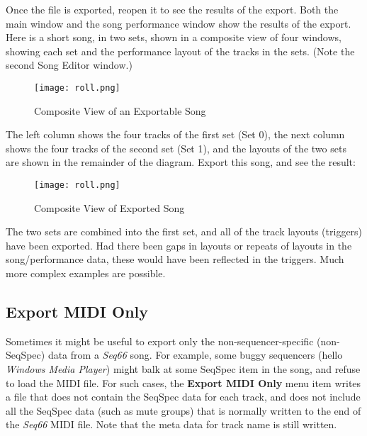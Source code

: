   Once the file is exported, reopen it to see the results of the export.
   Both the main window and the song performance window show the results of the
   export.
   Here is a short song, in two sets, shown in a composite view of
   four windows,
   showing each set and the performance layout of the tracks in the sets.
   (Note the second Song Editor window.)

\begin{figure}[H]
   \centering 
   \texttt{[image: roll.png]}
   \caption{Composite View of an Exportable Song}
   \label{fig:original_song_to_export}
\end{figure}

   The left column shows the four tracks of the first set (Set 0), the next
   column shows the four tracks of the second set (Set 1), and the
   layouts of the two sets are shown in the remainder of the diagram.
   Export this song, and see the result:

\begin{figure}[H]
   \centering 
   \texttt{[image: roll.png]}
   \caption{Composite View of Exported Song}
   \label{fig:song_exported}
\end{figure}

   The two sets are combined into the first set,
   and all of the track layouts (triggers) have been exported.
   Had there been gaps in layouts or repeats of layouts in the song/performance
   data, these would have been reflected in the triggers.
   Much more complex examples are possible.

\subsection{Export MIDI Only}
\label{subsec:midi_export_file_export_midi_only}

   Sometimes it might be useful to export only the non-sequencer-specific
   (non-SeqSpec) data from a \textsl{Seq66} song.
   For example, some buggy sequencers
   (hello \textsl{Windows Media Player})
   might balk at some SeqSpec item in the song, and refuse to load the MIDI
   file.
   For such cases,
   the \textbf{Export MIDI Only} menu item writes a file that does not contain
   the SeqSpec data for each track, and does not include all the SeqSpec data
   (such as mute groups) that is normally written to the end of the
   \textsl{Seq66} MIDI file.
   Note that the meta data for track name is still written.

